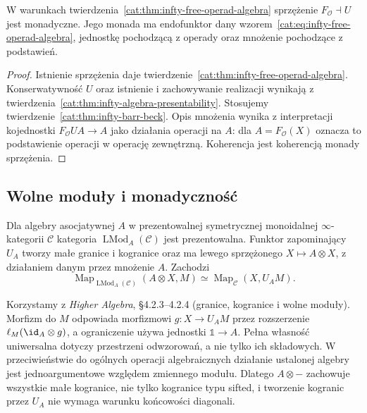 \begin{wniosek}\label{cat:cor:infty-free-algebra-monadic}
W warunkach twierdzenia~\ref{cat:thm:infty-free-operad-algebra} sprzężenie $F_{\mathcal O}\dashv U$ jest monadyczne. Jego monada ma endofunktor dany wzorem~\eqref{cat:eq:infty-free-operad-algebra}, jednostkę pochodzącą z operady oraz mnożenie pochodzące z podstawień.
\end{wniosek}
\begin{proof}
Istnienie sprzężenia daje twierdzenie~\ref{cat:thm:infty-free-operad-algebra}. Konserwatywność $U$ oraz istnienie i zachowywanie realizacji wynikają z twierdzenia~\ref{cat:thm:infty-algebra-presentability}. Stosujemy twierdzenie~\ref{cat:thm:infty-barr-beck}. Opis mnożenia wynika z interpretacji kojednostki $F_{\mathcal O}UA\to A$ jako działania operacji na $A$: dla $A=F_{\mathcal O}(X)$ oznacza to podstawienie operacji w operację zewnętrzną. Koherencja jest koherencją monady sprzężenia.
\end{proof}

\subsection{Wolne moduły i monadyczność}

\begin{twierdzenie}\label{cat:thm:infty-free-module}
Dla algebry asocjatywnej $A$ w prezentowalnej symetrycznej monoidalnej $\infty$-kategorii $\mathcal C$ kategoria $\operatorname{LMod}_A(\mathcal C)$ jest prezentowalna. Funktor zapominający $U_A$ tworzy małe granice i kogranice oraz ma lewego sprzężonego $X\mapsto A\otimes X$, z działaniem danym przez mnożenie $A$. Zachodzi
\[
 \operatorname{Map}_{\operatorname{LMod}_A(\mathcal C)}
 (A\otimes X,M)\simeq\operatorname{Map}_{\mathcal C}(X,U_AM).
\]
\end{twierdzenie}

Korzystamy z \emph{Higher Algebra}, \S4.2.3--4.2.4 (granice, kogranice i wolne moduły). Morfizm do $M$ odpowiada morfizmowi $g:X\to U_AM$ przez rozszerzenie $\ell_M(\id_A\otimes g)$, a ograniczenie używa jednostki $\mathbb 1\to A$. Pełna własność uniwersalna dotyczy przestrzeni odwzorowań, a nie tylko ich składowych. W przeciwieństwie do ogólnych operacji algebraicznych działanie ustalonej algebry jest jednoargumentowe względem zmiennego modułu. Dlatego $A\otimes-$ zachowuje wszystkie małe kogranice, nie tylko kogranice typu sifted, i tworzenie kogranic przez $U_A$ nie wymaga warunku końcowości diagonali.


